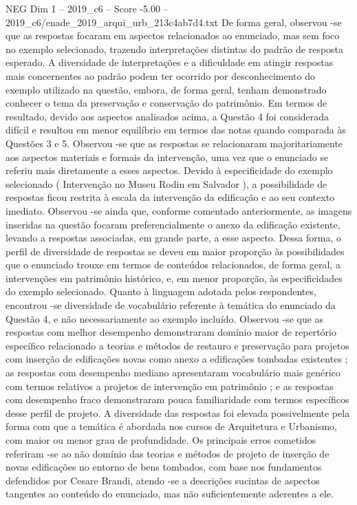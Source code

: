 \begin{textsample}{NEG Dim 1 – 2019\_c6 – Score -5.00 – 2019\_c6/enade\_2019\_arqui\_urb\_213c4ab7d4.txt}
De forma geral, observou -se que as respostas focaram em aspectos relacionados ao enunciado, mas sem foco no exemplo selecionado, trazendo interpretações distintas do padrão de resposta esperado.
A diversidade de interpretações e a dificuldade em atingir respostas mais concernentes ao padrão podem ter ocorrido por desconhecimento do exemplo utilizado na questão, embora, de forma geral, tenham demonstrado conhecer o tema da preservação e conservação do patrimônio.
Em termos de resultado, devido aos aspectos analisados acima, a Questão 4 foi considerada difícil e resultou em menor equilíbrio em termos das notas quando comparada às Questões 3 e 5.
Observou -se que as respostas se relacionaram majoritariamente aos aspectos materiais e formais da intervenção, uma vez que o enunciado se referiu mais diretamente a esses aspectos.
Devido à especificidade do exemplo selecionado ( Intervenção no Museu Rodin em Salvador ), a possibilidade de respostas ficou restrita à escala da intervenção da edificação e ao seu contexto imediato.
Observou -se ainda que, conforme comentado anteriormente, as imagens inseridas na questão focaram preferencialmente o anexo da edificação existente, levando a respostas associadas, em grande parte, a esse aspecto.
Dessa forma, o perfil de diversidade de respostas se deveu em maior proporção às possibilidades que o enunciado trouxe em termos de conteúdos relacionados, de forma geral, a intervenções em patrimônio histórico, e, em menor proporção, às especificidades do exemplo selecionado.
Quanto à linguagem adotada pelos respondentes, encontrou -se diversidade de vocabulário referente à temática do enunciado da Questão 4, e não necessariamente ao exemplo incluído.
Observou -se que as respostas com melhor desempenho demonstraram domínio maior de repertório específico relacionado a teorias e métodos de restauro e preservação para projetos com inserção de edificações novas como anexo a edificações tombadas existentes ; as respostas com desempenho mediano apresentaram vocabulário mais genérico com termos relativos a projetos de intervenção em patrimônio ; e as respostas com desempenho fraco demonstraram pouca familiaridade com termos específicos desse perfil de projeto.
A diversidade das respostas foi elevada possivelmente pela forma com que a temática é abordada nos cursos de Arquitetura e Urbanismo, com maior ou menor grau de profundidade.
Os principais erros cometidos referiram -se ao não domínio das teorias e métodos de projeto de inserção de novas edificações no entorno de bens tombados, com base nos fundamentos defendidos por Cesare Brandi, atendo -se a descrições sucintas de aspectos tangentes ao conteúdo do enunciado, mas não suficientemente aderentes a ele.

\end{textsample}
